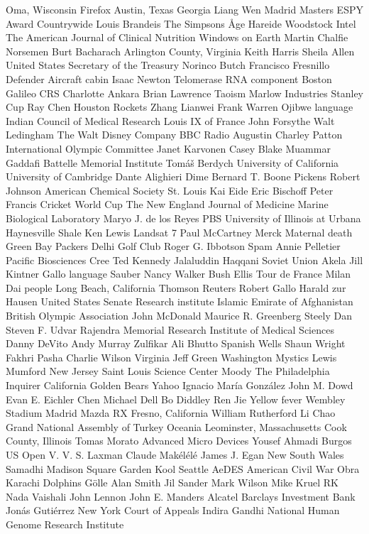 Oma, Wisconsin  Firefox  Austin, Texas  
Georgia   Liang Wen  Madrid Masters   
ESPY Award  Countrywide  Louis Brandeis  
The Simpsons  Åge Hareide  Woodstock  
Intel  The American Journal of Clinical Nutrition  Windows on Earth  
Martin Chalfie  Norsemen  Burt Bacharach  
Arlington County, Virginia  Keith Harris   Sheila Allen  
United States Secretary of the Treasury  Norinco  Butch Francisco  
Fresnillo  Defender   Aircraft cabin  
Isaac Newton  Telomerase RNA component  Boston  
Galileo CRS  Charlotte  Ankara  
Brian Lawrence  Taoism  Marlow Industries  
Stanley Cup  Ray Chen  Houston Rockets  
Zhang Lianwei  Frank Warren   Ojibwe language  
Indian Council of Medical Research  Louis IX of France  John Forsythe  
Walt Ledingham  The Walt Disney Company  BBC Radio  
Augustin  Charley Patton  International Olympic Committee  
Janet Karvonen  Casey Blake  Muammar Gaddafi  
Battelle Memorial Institute  Tomáš Berdych  University of California  
University of Cambridge  Dante Alighieri  Dime   
Bernard  T. Boone Pickens  Robert Johnson  
American Chemical Society  St. Louis  Kai Eide  
Eric Bischoff  Peter Francis   Cricket World Cup  
The New England Journal of Medicine  Marine Biological Laboratory  Maryo J. de los Reyes  
PBS  University of Illinois at Urbana  Haynesville Shale  
Ken Lewis   Landsat 7  Paul McCartney  
Merck   Maternal death  Green Bay Packers  
Delhi Golf Club  Roger G. Ibbotson  Spam   
Annie Pelletier  Pacific Biosciences  Cree  
Ted Kennedy  Jalaluddin Haqqani  Soviet Union  
Akela   Jill Kintner  Gallo language  
Sauber  Nancy Walker Bush Ellis  Tour de France  
Milan  Dai people  Long Beach, California  
Thomson Reuters  Robert Gallo  Harald zur Hausen  
United States Senate  Research institute  Islamic Emirate of Afghanistan  
British Olympic Association  John McDonald   Maurice R. Greenberg  
Steely Dan  Steven F. Udvar  Rajendra Memorial Research Institute of Medical Sciences  
Danny DeVito  Andy Murray  Zulfikar Ali Bhutto  
Spanish Wells  Shaun Wright  Fakhri Pasha  
Charlie Wilson   Virginia  Jeff Green   
Washington Mystics  Lewis Mumford  New Jersey  
Saint Louis Science Center  Moody  The Philadelphia Inquirer  
California Golden Bears  Yahoo  Ignacio María González  
John M. Dowd  Evan E. Eichler  Chen   
Michael Dell  Bo Diddley  Ren Jie  
Yellow fever  Wembley Stadium   Madrid  
Mazda RX  Fresno, California  William Rutherford   
Li Chao   Grand National Assembly of Turkey  Oceania  
Leominster, Massachusetts  Cook County, Illinois  Tomas Morato  
Advanced Micro Devices  Yousef Ahmadi  Burgos  
US Open   V. V. S. Laxman  Claude Makélélé  
James J. Egan  New South Wales  Samadhi  
Madison Square Garden  Kool  Seattle  
AeDES   American Civil War  Obra   
Karachi Dolphins  Gölle  Alan Smith   
Jil Sander  Mark Wilson   Mike Kruel  
RK Nada  Vaishali   John Lennon  
John E. Manders  Alcatel  Barclays Investment Bank  
Jonás Gutiérrez  New York Court of Appeals  Indira Gandhi  
National Human Genome Research Institute  